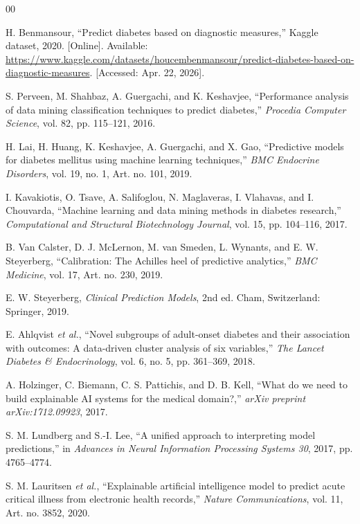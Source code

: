 \documentclass[conference]{IEEEtran}
\begin{document}
\begin{thebibliography}{00}

H. Benmansour, ``Predict diabetes based on diagnostic measures,'' Kaggle dataset, 2020. [Online]. Available: \url{https://www.kaggle.com/datasets/houcembenmansour/predict-diabetes-based-on-diagnostic-measures}. [Accessed: Apr. 22, 2026].

S. Perveen, M. Shahbaz, A. Guergachi, and K. Keshavjee, ``Performance analysis of data mining classification techniques to predict diabetes,'' \textit{Procedia Computer Science}, vol. 82, pp. 115--121, 2016.

H. Lai, H. Huang, K. Keshavjee, A. Guergachi, and X. Gao, ``Predictive models for diabetes mellitus using machine learning techniques,'' \textit{BMC Endocrine Disorders}, vol. 19, no. 1, Art. no. 101, 2019.

I. Kavakiotis, O. Tsave, A. Salifoglou, N. Maglaveras, I. Vlahavas, and I. Chouvarda, ``Machine learning and data mining methods in diabetes research,'' \textit{Computational and Structural Biotechnology Journal}, vol. 15, pp. 104--116, 2017.

B. Van Calster, D. J. McLernon, M. van Smeden, L. Wynants, and E. W. Steyerberg, ``Calibration: The Achilles heel of predictive analytics,'' \textit{BMC Medicine}, vol. 17, Art. no. 230, 2019.

E. W. Steyerberg, \textit{Clinical Prediction Models}, 2nd ed. Cham, Switzerland: Springer, 2019.

E. Ahlqvist \textit{et al.}, ``Novel subgroups of adult-onset diabetes and their association with outcomes: A data-driven cluster analysis of six variables,'' \textit{The Lancet Diabetes \& Endocrinology}, vol. 6, no. 5, pp. 361--369, 2018.

A. Holzinger, C. Biemann, C. S. Pattichis, and D. B. Kell, ``What do we need to build explainable AI systems for the medical domain?,'' \textit{arXiv preprint arXiv:1712.09923}, 2017.

S. M. Lundberg and S.-I. Lee, ``A unified approach to interpreting model predictions,'' in \textit{Advances in Neural Information Processing Systems 30}, 2017, pp. 4765--4774.

S. M. Lauritsen \textit{et al.}, ``Explainable artificial intelligence model to predict acute critical illness from electronic health records,'' \textit{Nature Communications}, vol. 11, Art. no. 3852, 2020.

\end{thebibliography}
\end{document}
